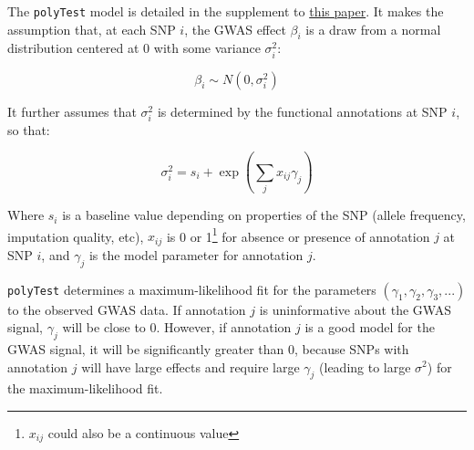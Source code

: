 \documentclass[12pt]{scrartcl}
\begin{document}
\maketitle

The \texttt{polyTest} model is detailed in the supplement to
\href{http://science.sciencemag.org/content/352/6285/600}{this paper}. It
makes the assumption that, at each SNP $i$, the GWAS effect
$\beta_i$ is a draw from a normal distribution centered at 0 with some
variance $\sigma^2_i$:

\[\beta_i \sim N(0,\sigma^2_i)\]

It further assumes that $\sigma^2_i$ is determined by the functional
annotations at SNP $i$, so that:

\[\sigma^2_i = s_i + \exp(\sum_j x_{ij} \gamma_j)\]

Where $s_i$ is a baseline value depending on properties of the SNP (allele
frequency, imputation quality, etc),  $x_{ij}$ is 0 or 1\footnote[1]{$x_{ij}$
could also be a continuous value} for absence or presence of annotation $j$ at
SNP $i$, and $\gamma_j$ is the model parameter for annotation $j$.

\texttt{polyTest} determines a maximum-likelihood fit for the parameters
$(\gamma_1, \gamma_2, \gamma_3, ...)$ to the observed GWAS data.
If annotation $j$ is uninformative about the GWAS signal, $\gamma_j$ will be
close to 0. However, if annotation $j$ is a good model for the GWAS signal, it
will be significantly greater than 0, because SNPs with annotation $j$ will
have large effects and require large $\gamma_j$ (leading to large $\sigma^2$)
for the maximum-likelihood fit.
\end{document}
